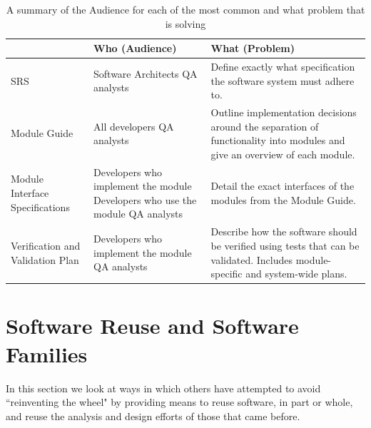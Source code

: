 \begin{table}[h]
\caption{A summary of the Audience for each of the most common \sfs{} and what 
problem that \sf{} is solving}
\label{tab:sfsummary}
\begin{tabular}{| P{.3\linewidth} | p{.3\linewidth}  | p{.3\linewidth} |}
\hline
 \SF{} & Who (Audience) & What (Problem)
\\ \hline
	SRS & 

	Software Architects \newline \newline
	QA analysts & 

	Define exactly what specification the software system must adhere to. 
\\ \hline
	Module Guide & 

	All developers \newline \newline
	QA analysts  & 

	Outline implementation decisions around the separation of functionality 
	into modules and give an overview of each module.
\\ \hline
	Module Interface Specifications & 

	Developers who implement the module \newline \newline
	Developers who use the module \newline \newline
	QA analysts & 

	Detail the exact interfaces of the modules from the Module Guide.
\\ \hline
	Verification and Validation Plan &
	
	Developers who implement the module \newline \newline
	QA analysts &

	Describe how the software should be verified using tests that can be 
	validated. Includes module-specific and system-wide plans.
\\ \hline
\end{tabular}
\end{table}

\section{Software Reuse and Software Families}

In this section we look at ways in which others have attempted to avoid 
``reinventing the wheel" by providing means to reuse software, in part or 
whole, and reuse the analysis and design efforts of those that came before.

